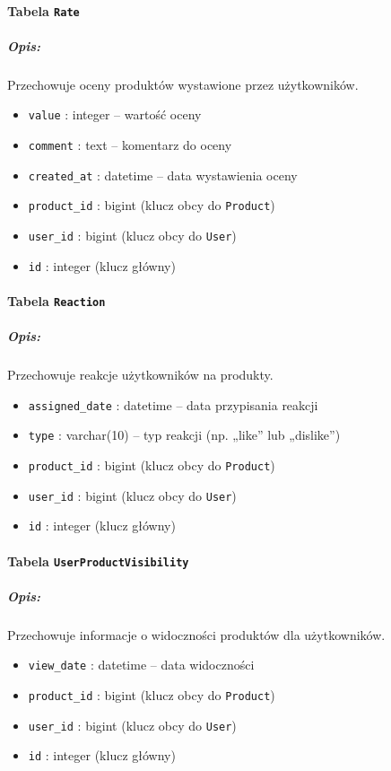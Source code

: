 \documentclass[12pt,a4paper,oneside]{article}
\theoremstyle{definition}
\numberwithin{equation}{section}
\begin{document}
\paragraph{Tabela \texttt{Rate}}
\subparagraph{Opis:} Przechowuje oceny produktów wystawione przez użytkowników.
\begin{itemize}
    \item \texttt{value} : integer – wartość oceny
    \item \texttt{comment} : text – komentarz do oceny
    \item \texttt{created\string_at} : datetime – data wystawienia oceny
    \item \texttt{product\string_id} : bigint (klucz obcy do \texttt{Product})
    \item \texttt{user\string_id} : bigint (klucz obcy do \texttt{User})
    \item \texttt{id} : integer (klucz główny)
\end{itemize}

\paragraph{Tabela \texttt{Reaction}}
\subparagraph{Opis:} Przechowuje reakcje użytkowników na produkty.
\begin{itemize}
    \item \texttt{assigned\string_date} : datetime – data przypisania reakcji
    \item \texttt{type} : varchar(10) – typ reakcji (np. „like” lub „dislike”)
    \item \texttt{product\string_id} : bigint (klucz obcy do \texttt{Product})
    \item \texttt{user\string_id} : bigint (klucz obcy do \texttt{User})
    \item \texttt{id} : integer (klucz główny)
\end{itemize}

\paragraph{Tabela \texttt{UserProductVisibility}}
\subparagraph{Opis:} Przechowuje informacje o widoczności produktów dla użytkowników.
\begin{itemize}
    \item \texttt{view\string_date} : datetime – data widoczności
    \item \texttt{product\string_id} : bigint (klucz obcy do \texttt{Product})
    \item \texttt{user\string_id} : bigint (klucz obcy do \texttt{User})
    \item \texttt{id} : integer (klucz główny)
\end{itemize}
\end{document}
